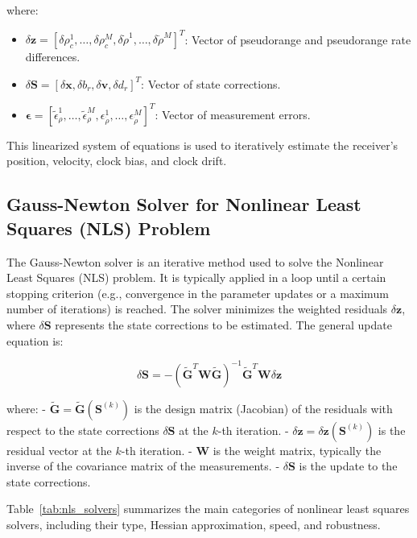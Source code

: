 \documentclass[conference]{IEEEtran}
\begin{document}
where:
\begin{itemize}
    \item \( \delta \mathbf{z} = [\delta \rho_c^1, \dots, \delta \rho_c^M, \delta \dot{\rho}^1, \dots, \delta \dot{\rho}^M]^T \): Vector of pseudorange and pseudorange rate differences.
    \item \( \delta \mathbf{S} = [\delta \mathbf{x}, \delta b_r, \delta \mathbf{v}, \delta d_r]^T \): Vector of state corrections.
    \item \( \boldsymbol{\epsilon} = [\tilde{\epsilon}_\rho^1, \dots, \tilde{\epsilon}_\rho^M, \epsilon_{\dot{\rho}}^1, \dots, \epsilon_{\dot{\rho}}^M]^T \): Vector of measurement errors.
\end{itemize}

This linearized system of equations is used to iteratively estimate the receiver's position, velocity, clock bias, and clock drift.

\subsection*{Gauss-Newton Solver for Nonlinear Least Squares (NLS) Problem}

The Gauss-Newton solver is an iterative method used to solve the Nonlinear Least Squares (NLS) problem. It is typically applied in a loop until a certain stopping criterion (e.g., convergence in the parameter updates or a maximum number of iterations) is reached. The solver minimizes the weighted residuals \( \delta \mathbf{z} \), where \( \delta \mathbf{S} \) represents the state corrections to be estimated. The general update equation is:

\begin{equation}
\delta \mathbf{S} = -(\tilde{\mathbf{G}}^T \mathbf{W} \tilde{\mathbf{G}})^{-1} \tilde{\mathbf{G}}^T \mathbf{W} \delta \mathbf{z}
\end{equation}

where:
- \( \tilde{\mathbf{G}} = \tilde{\mathbf{G}}(\mathbf{S}^{(k)}) \) is the design matrix (Jacobian) of the residuals with respect to the state corrections \( \delta \mathbf{S} \) at the \( k \)-th iteration.
- \( \delta \mathbf{z} = \delta \mathbf{z}(\mathbf{S}^{(k)}) \) is the residual vector at the \( k \)-th iteration.
- \( \mathbf{W} \) is the weight matrix, typically the inverse of the covariance matrix of the measurements.
- \( \delta \mathbf{S} \) is the update to the state corrections.

Table~\ref{tab:nls_solvers} summarizes the main categories of nonlinear least squares solvers, including their type, Hessian approximation, speed, and robustness.
\end{document}
